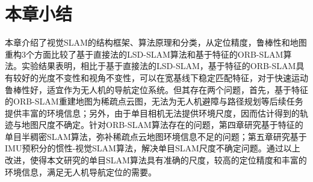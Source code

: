 \section{本章小结}
本章介绍了视觉SLAM的结构框架、算法原理和分类，从定位精度，鲁棒性和地图重构3个方面比较了基于直接法的LSD-SLAM算法和基于特征的ORB-SLAM算法。实验结果表明，相比于基于直接法的LSD-SLAM，基于特征的ORB-SLAM具有较好的光度不变性和视角不变性，可以在宽基线下稳定匹配特征，对于快速运动鲁棒性好，适宜作为无人机的导航定位系统。但其存在两个问题，首先，基于特征的ORB-SLAM重建地图为稀疏点云图，无法为无人机避障与路径规划等后续任务提供丰富的环境信息；另外，由于单目相机无法提供环境尺度，因而估计得到的轨迹与地图尺度不确定。针对ORB-SLAM算法存在的问题，第四章研究基于特征的单目半稠密SLAM算法，弥补稀疏点云地图环境信息不足的问题；第五章研究基于IMU预积分的惯性-视觉SLAM算法，解决单目SLAM尺度不确定问题。通过以上改进，使得本文研究的单目SLAM算法具有准确的尺度，较高的定位精度和丰富的环境信息，满足无人机导航定位的需要。


